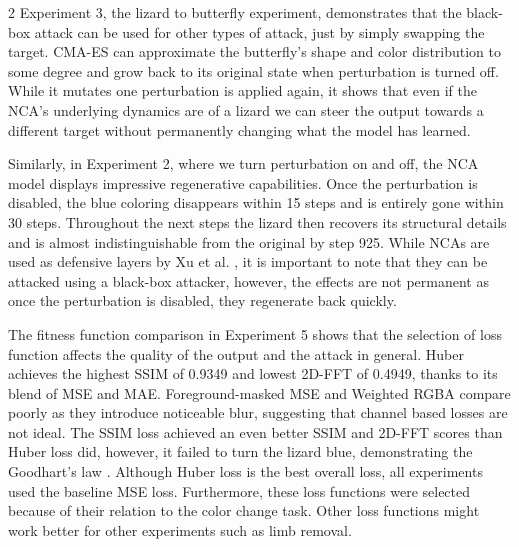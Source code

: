 \documentclass{article}
\begin{document}
\begin{multicols}{2}
Experiment 3, the lizard to butterfly experiment, demonstrates that the black-box attack can be used for other types of attack, just by simply swapping the target.
CMA-ES can approximate the butterfly's shape and color distribution to some degree and grow back to its original state when perturbation is turned off.
While it mutates one perturbation is applied again, it shows that even if the NCA's underlying dynamics are of a lizard we can steer the output towards a different target without permanently changing what the model has learned. 

Similarly, in Experiment 2, where we turn perturbation on and off, the NCA model displays impressive regenerative capabilities.
Once the perturbation is disabled, the blue coloring disappears within 15 steps and is entirely gone within 30 steps. Throughout the next steps the lizard then recovers its structural details and is almost indistinguishable from the original by step 925.
While NCAs are used as defensive layers by Xu et al. \cite{xu2024adanca}, it is important to note that they can be attacked using a black-box attacker, however, the effects are not permanent as once the perturbation is disabled, they regenerate back quickly. 

The fitness function comparison in Experiment 5 shows that the selection of loss function affects the quality of the output and the attack in general.
Huber achieves the highest SSIM of 0.9349 and lowest 2D-FFT of 0.4949, thanks to its blend of MSE and MAE. 
Foreground-masked MSE and Weighted RGBA compare poorly as they introduce noticeable blur, suggesting that channel based losses are not ideal. 
The SSIM loss achieved an even better SSIM and 2D-FFT scores than Huber loss did, however, it failed to turn the lizard blue, demonstrating the Goodhart's law \cite{strathern1997improving}.  
Although Huber loss is the best overall loss, all experiments used the baseline MSE loss. 
Furthermore, these loss functions were selected because of their relation to the color change task. Other loss functions might work better for other experiments such as limb removal.




\end{multicols}
\end{document}
